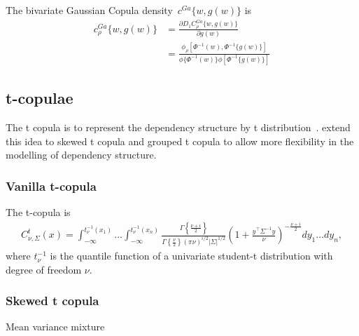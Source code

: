 The bivariate Gaussian Copula density~$c^{Ga}\{w, g(w)\}$ is
\begin{align}
    c_\rho^{Ga}\{w, g(w)\} &= \frac{\partial D_1C_\rho^{Ga}\{w, g(w)\}}{\partial g(w)}\\
                           &= \frac{\phi_\rho [\Phi^{-1}(w), \Phi^{-1}\{g(w)\}]}
                            {\phi\{\Phi^{-1}(w)\}\phi[\Phi^{-1}\{g(w)\}]}
    \end{align}




\subsection{t-copulae}\label{subsec:t-copulae}
The t copula is to represent the dependency structure by t distribution~\citep{fang2002meta, embrechts2002correlation}.
\cite{demarta2005t} extend this idea to skewed t copula and grouped t copula to allow more flexibility in the modelling of dependency structure.

\subsubsection{Vanilla t-copula}\label{subsec:vanilla-t-copula}
The t-copula is
\begin{align}
    C^t_{\nu, \Sigma}(x) =
    \int_{-\infty}^{t_\nu^{-1}(x_1)} \dots \int_{-\infty}^{t_\nu^{-1}(x_n)}
    \frac{\Gamma\left\{ \frac{\nu + i}{2}\right\}}{\Gamma \left\{\frac{\nu}{2}\right\} (\pi \nu)^{i/2}|\Sigma|^{1/2}}
    \left(
    1+ \frac{y^\top \Sigma^{-1}y}{\nu}
    \right)^{-\frac{\nu + i}{2}}
    dy_1 \dots dy_n,
    \end{align}
where $t^{-1}_\nu$ is the quantile function of a univariate student-t distribution with degree of freedom $\nu$.

\subsubsection{Skewed t copula}\label{subsec:skewed-t-copula}
Mean variance mixture

